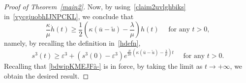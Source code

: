 \documentclass[12pt,a4paper,intlimits,sumlimits]{amsart}
\theoremstyle{definition}
\theoremstyle{plain}
\numberwithin{equation}{section}
\renewcommand{\ge}{\geqslant}
\begin{document}
\begin{proof}[Proof of Theorem~\ref{main2}]
Now, by using~\eqref{claim2uvlghbiks} in~\eqref{vycgiuobhIJNPCKL}, we conclude that
\[
\frac{\kappa}{\mu}\dot h(t)\ge\frac12\left(\kappa(\overline{u}-\widetilde u)-\frac{\lambda}{\mu}\right) h(t)\quad\mbox{ for any } t> 0,
\]
namely, by recalling the definition in~\eqref{hdefn},
\[
s^3(t)\ge \varepsilon^3 + (s^3(0)-\varepsilon^3) e^{\frac{\mu}{2\kappa}\left(\kappa(\overline{u}-\widetilde u)-\frac{\lambda}{\mu}\right)t}\quad\mbox{ for any } t>0.
\]
Recalling that \eqref{bdwipKMEJFà-} is in force, by taking the limit as $t\to +\infty$, we obtain the desired result.
\end{proof}

\begin{appendix}


\end{appendix}
\end{document}
